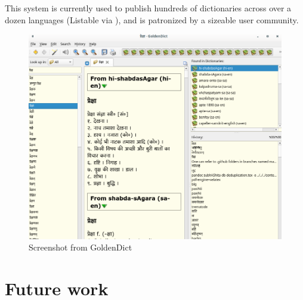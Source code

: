 \documentclass[11pt]{article}
\begin{document}
This system is currently used to publish hundreds of dictionaries across over a dozen languages (Listable via \cite{stardict_index}), and is patronized by a sizeable user community.

\begin{figure}[h]
\caption{Screenshot from GoldenDict}
\centering
\includegraphics[width=1.0\textwidth]{images/goldendict-desktop-screenshot}
\end{figure}


\section{Future work}



\end{document}
